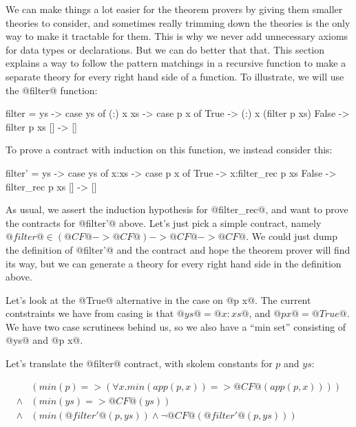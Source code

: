 

We can make things a lot easier for the theorem provers by giving them
smaller theories to consider, and sometimes really trimming down the
theories is the only way to make it tractable for them. This is why we
never add unnecessary axioms for data types or declarations. But we
can do better that that. This section explains a way to follow the
pattern matchings in a recursive function to make a separate theory
for every right hand side of a function. To illustrate, we will
use the @filter@ function:

\begin{code}
    filter = \p ys -> case ys of
        (:) x xs -> case p x of
            True -> (:) x (filter p xs)
            False -> filter p xs
        [] -> []
\end{code}

To prove a contract with induction on this function, we instead
consider this:

\begin{code}
    filter' = \p ys -> case ys of
        x:xs -> case p x of
            True -> x:filter_rec p xs
            False -> filter_rec p xs
        [] -> []
\end{code}

As usual, we assert the induction hypothesis for @filter_rec@, and
want to prove the contracts for @filter'@ above. Let's just pick
a simple contract, namely $@filter@ \in (@CF@ -> @CF@) -> @CF@ -> @CF@$.
We could just dump the definition of @filter'@ and the contract
and hope the theorem prover will find its way, but we can generate
a theory for every right hand side in the definition above.

Let's look at the @True@ alternative in the case on @p x@. The
current contstraints we have from casing is that $@ys@ = @x:xs@$,
and $@p x@ = @True@$. We have two case scrutinees behind us, so
we also have a ``min set'' consisting of @ys@ and @p x@.

Let's translate the @filter@ contract, with skolem constants for
$p$ and $ys$:

\[\begin{array}{rl}
      & (min(p) => (\forall x . min(app(p,x)) => @CF@(app(p,x)))) \\
\land & (min(ys) => @CF@(ys)) \\
\land & (min(@filter'@(p,ys)) \land \neg @CF@(@filter'@(p,ys)))
\end{array}\]

